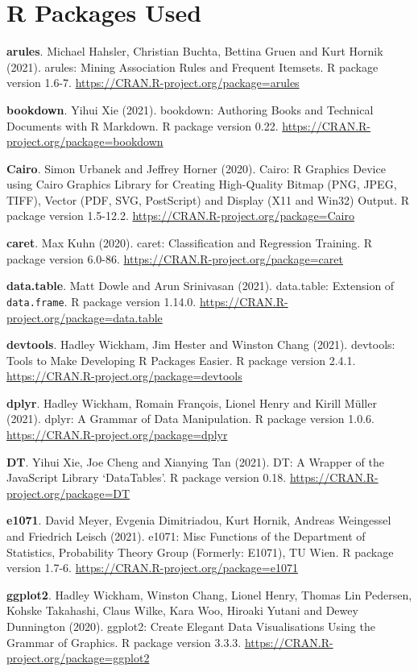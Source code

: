 \documentclass[12pt,]{krantz}
\begin{document}
\section*{R Packages Used}\label{r-packages-used}


\textbf{arules}. Michael Hahsler, Christian Buchta, Bettina Gruen and
Kurt Hornik (2021). arules: Mining Association Rules and Frequent
Itemsets. R package version 1.6-7.
\url{https://CRAN.R-project.org/package=arules}

\textbf{bookdown}. Yihui Xie (2021). bookdown: Authoring Books and
Technical Documents with R Markdown. R package version 0.22.
\url{https://CRAN.R-project.org/package=bookdown}

\textbf{Cairo}. Simon Urbanek and Jeffrey Horner (2020). Cairo: R
Graphics Device using Cairo Graphics Library for Creating High-Quality
Bitmap (PNG, JPEG, TIFF), Vector (PDF, SVG, PostScript) and Display (X11
and Win32) Output. R package version 1.5-12.2.
\url{https://CRAN.R-project.org/package=Cairo}

\textbf{caret}. Max Kuhn (2020). caret: Classification and Regression
Training. R package version 6.0-86.
\url{https://CRAN.R-project.org/package=caret}

\textbf{data.table}. Matt Dowle and Arun Srinivasan (2021). data.table:
Extension of \texttt{data.frame}. R package version 1.14.0.
\url{https://CRAN.R-project.org/package=data.table}

\textbf{devtools}. Hadley Wickham, Jim Hester and Winston Chang (2021).
devtools: Tools to Make Developing R Packages Easier. R package version
2.4.1. \url{https://CRAN.R-project.org/package=devtools}

\textbf{dplyr}. Hadley Wickham, Romain François, Lionel Henry and Kirill
Müller (2021). dplyr: A Grammar of Data Manipulation. R package version
1.0.6. \url{https://CRAN.R-project.org/package=dplyr}

\textbf{DT}. Yihui Xie, Joe Cheng and Xianying Tan (2021). DT: A Wrapper
of the JavaScript Library `DataTables'. R package version 0.18.
\url{https://CRAN.R-project.org/package=DT}

\textbf{e1071}. David Meyer, Evgenia Dimitriadou, Kurt Hornik, Andreas
Weingessel and Friedrich Leisch (2021). e1071: Misc Functions of the
Department of Statistics, Probability Theory Group (Formerly: E1071), TU
Wien. R package version 1.7-6.
\url{https://CRAN.R-project.org/package=e1071}

\textbf{ggplot2}. Hadley Wickham, Winston Chang, Lionel Henry, Thomas
Lin Pedersen, Kohske Takahashi, Claus Wilke, Kara Woo, Hiroaki Yutani
and Dewey Dunnington (2020). ggplot2: Create Elegant Data Visualisations
Using the Grammar of Graphics. R package version 3.3.3.
\url{https://CRAN.R-project.org/package=ggplot2}
\end{document}
